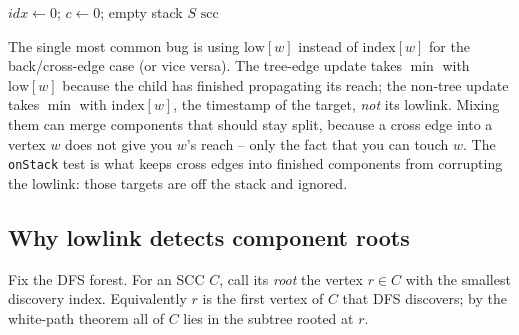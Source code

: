 \begin{algorithm}[H]
\caption{Tarjan SCC}
\label{ch05:alg-tarjan}
\DontPrintSemicolon
{}
$\mathit{idx}\gets 0$; $c\gets 0$; empty stack $S$\;
\Return $\mathrm{scc}$\;
\BlankLine
{}
\end{algorithm}

\begin{trapbox}
The single most common bug is using $\mathrm{low}[w]$ instead of $\mathrm{index}[w]$ for the back/cross-edge case (or vice versa). The tree-edge update takes $\min$ with $\mathrm{low}[w]$ because the child has finished propagating its reach; the non-tree update takes $\min$ with $\mathrm{index}[w]$, the timestamp of the target, \emph{not} its lowlink. Mixing them can merge components that should stay split, because a cross edge into a vertex $w$ does not give you $w$'s reach -- only the fact that you can touch $w$. The \texttt{onStack} test is what keeps cross edges into finished components from corrupting the lowlink: those targets are off the stack and ignored.
\end{trapbox}

\subsection{Why lowlink detects component roots}

Fix the DFS forest. For an SCC $C$, call its \emph{root} the vertex $r\in C$ with the smallest discovery index. Equivalently $r$ is the first vertex of $C$ that DFS discovers; by the white-path theorem all of $C$ lies in the subtree rooted at $r$.

